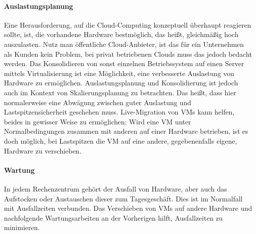\paragraph*{Auslastungsplanung}
\label{sec:auslastungsplanung}

Eine Herausforderung, auf die Cloud-Computing konzeptuell überhaupt
reagieren sollte, ist, die vorhandene Hardware bestmöglich, das heißt,
gleichmäßig hoch auszulasten. Nutz man öffentliche Cloud-Anbieter, ist
das für ein Unternehmen als Kunden kein Problem, bei privat
betriebenen Clouds muss das jedoch bedacht werden. Das Konsolidieren
von sonst einzelnen Betriebssystem auf einen Server mittels
Virtualisierung ist eine Möglichkeit, eine verbesserte Auslastung von
Hardware zu ermöglichen. Auslastungsplanung und Konsolidierung ist
jedoch auch im Kontext von Skalierungsplanung zu betrachten. Das
heißt, dass hier normalerweise eine Abwägung zwischen guter Auslastung
und Lastspitzensicherheit geschehen muss. Live-Migration von \acp{VM}
kann helfen, beides in gewisser Weise zu ermöglichen: Wird eine
\ac{VM} unter Normalbedingungen zusammen mit anderen auf einer
Hardware betrieben, ist es doch möglich, bei Lastspitzen die \ac{VM}
auf eine andere, gegebenenfalls eigene, Hardware zu verschieben.

\paragraph*{Wartung}
\label{sec:wartung}

In jedem Rechenzentrum gehört der Ausfall von Hardware, aber auch das
Aufstocken oder Austauschen dieser zum Tagesgeschäft. Dies ist im
Normalfall mit Ausfallzeiten verbunden. Das Verschieben von \acp{VM}
auf andere Hardware und nachfolgende Wartungsarbeiten an der
Vorherigen hilft, Ausfallzeiten zu minimieren.


